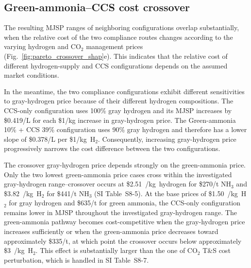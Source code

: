 \subsection{Green-ammonia--CCS cost crossover}
\label{sec:h2_crossover}

The resulting MJSP ranges of neighboring configurations overlap substantially, when the relative cost of the two compliance routes changes according to the varying hydrogen and CO$_2$ management prices (Fig.~\ref{fig:pareto_crossover_shap}e).
This indicates that the relative cost of different hydrogen-supply and CCS configurations depends on the assumed market conditions.

In the meantime, the two compliance configurations exhibit different sensitivities to gray-hydrogen price because of their different hydrogen compositions. The CCS-only configuration uses 100\% gray hydrogen and its MJSP increases by \$0.419/L for each \$1/kg increase in gray-hydrogen price. The Green-ammonia 10\% + CCS 39\% configuration uses 90\% gray hydrogen and therefore has a lower slope of \$0.378/L per \$1/kg~H$_2$. Consequently, increasing gray-hydrogen price progressively narrows the cost difference between the two configurations.

The crossover gray-hydrogen price depends strongly on the green-ammonia price. Only the two lowest green-ammonia price cases cross within the investigated gray-hydrogen range--crossover occurs at \$2.51~/kg~hydrogen for \$270/t NH$_3$ and \$3.82~/kg~H$_2$ for \$441/t NH$_3$ (SI Table~S8-5). At the base prices of \$1.50~/kg~H$_2$ for gray hydrogen and \$635/t for green ammonia, the CCS-only configuration remains lower in MJSP throughout the investigated gray-hydrogen range. The green-ammonia pathway becomes cost-competitive when the gray-hydrogen price increases sufficiently or when the green-ammonia price decreases toward approximately \$335/t, at which point the crossover occurs below approximately \$3~/kg~H$_2$.
This effect is substantially larger than the one of CO$_2$ T\&S cost perturbation, which is handled in SI Table~S8-7. 


